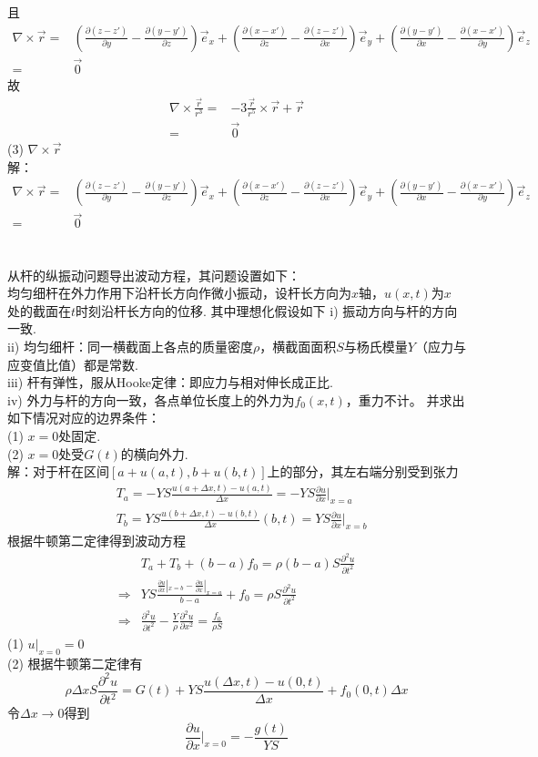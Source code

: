 \documentclass[10pt,a4paper]{article}
\begin{document}
且
\begin{align*}
\nabla\times\vec{r}=&(\frac{\partial(z-z')}{\partial y}-\frac{\partial(y-y')}{\partial z})\vec{e}_x+(\frac{\partial(x-x')}{\partial z}-\frac{\partial(z-z')}{\partial x})\vec{e}_y+(\frac{\partial(y-y')}{\partial x}-\frac{\partial(x-x')}{\partial y})\vec{e}_z\\
=&\vec{0}
\end{align*}
故
\begin{align*}
\nabla\times\frac{\vec{r}}{r^3}=&-3\frac{\vec{r}}{r^5}\times\vec{r}+\vec{r}\\
=&\vec{0}
\end{align*}
(3) $\nabla\times\vec{r}$\\
解：
\begin{align*}
\nabla\times\vec{r}=&(\frac{\partial(z-z')}{\partial y}-\frac{\partial(y-y')}{\partial z})\vec{e}_x+(\frac{\partial(x-x')}{\partial z}-\frac{\partial(z-z')}{\partial x})\vec{e}_y+(\frac{\partial(y-y')}{\partial x}-\frac{\partial(x-x')}{\partial y})\vec{e}_z\\
=&\vec{0}
\end{align*}
\section{}
从杆的纵振动问题导出波动方程，其问题设置如下：\\
均匀细杆在外力作用下沿杆长方向作微小振动，设杆长方向为$x$轴，$u(x,t)$为$x$\\处的截面在$t$时刻沿杆长方向的位移. 其中理想化假设如下
i) 振动方向与杆的方向一致.\\
ii) 均匀细杆：同一横截面上各点的质量密度$\rho$，横截面面积$S$与杨氏模量$Y$（应力与应变值比值）都是常数.\\
iii) 杆有弹性，服从Hooke定律：即应力与相对伸长成正比.\\
iv) 外力与杆的方向一致，各点单位长度上的外力为$f_0(x,t)$，重力不计。
并求出如下情况对应的边界条件：\\
(1) $x=0$处固定.\\
(2) $x=0$处受$G(t)$的横向外力.\\
解：对于杆在区间$[a+u(a,t),b+u(b,t)]$上的部分，其左右端分别受到张力
\begin{align*}
&T_a=-YS\frac{u(a+\Delta x,t)-u(a,t)}{\Delta x}=-YS\frac{\partial u}{\partial x}|_{x=a}\\
&T_b=YS\frac{u(b+\Delta x,t)-u(b,t)}{\Delta x}(b,t)=YS\frac{\partial u}{\partial x}|_{x=b}
\end{align*}
根据牛顿第二定律得到波动方程
\begin{align*}
&T_a+T_b+(b-a)f_0=\rho(b-a)S\frac{\partial^2u}{\partial t^2}\\
\Longrightarrow&YS\frac{\frac{\partial u}{\partial x}|_{x=b}-\frac{\partial u}{\partial x}|_{x=a}}{b-a}+f_0=\rho S\frac{\partial^2u}{\partial t^2}\\
\Longrightarrow&\frac{\partial^2u}{\partial t^2}-\frac{Y}{\rho}\frac{\partial^2u}{\partial x^2}=\frac{f_0}{\rho S}
\end{align*}
(1) $u|_{x=0}=0$\\
(2) 根据牛顿第二定律有
\[
\rho\Delta xS\frac{\partial^2u}{\partial t^2}=G(t)+YS\frac{u(\Delta x,t)-u(0,t)}{\Delta x}+f_0(0,t)\Delta x
\]
令$\Delta x\rightarrow0$得到
\[
\frac{\partial u}{\partial x}|_{x=0}=-\frac{g(t)}{YS}
\]
\end{document}
